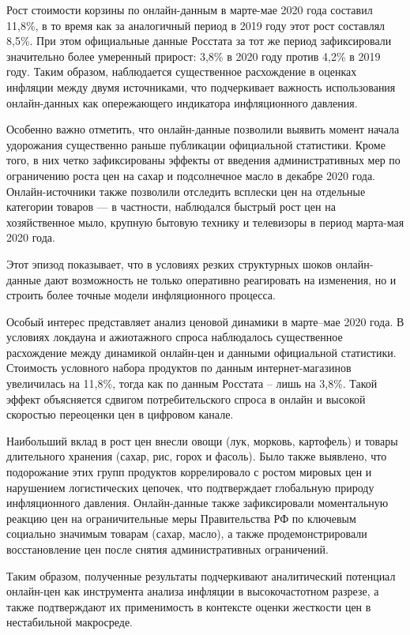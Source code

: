 Рост стоимости корзины по онлайн-данным в марте-мае 2020 года составил 11{,}8\%, в то время как за аналогичный период в 2019 году этот рост составлял 8{,}5\%. При этом официальные данные Росстата за тот же период зафиксировали значительно более умеренный прирост: 3{,}8\% в 2020 году против 4{,}2\% в 2019 году. Таким образом, наблюдается существенное расхождение в оценках инфляции между двумя источниками, что подчеркивает важность использования онлайн-данных как опережающего индикатора инфляционного давления.

Особенно важно отметить, что онлайн-данные позволили выявить момент начала удорожания существенно раньше публикации официальной статистики. Кроме того, в них четко зафиксированы эффекты от введения административных мер по ограничению роста цен на сахар и подсолнечное масло в декабре 2020 года. Онлайн-источники также позволили отследить всплески цен на отдельные категории товаров — в частности, наблюдался быстрый рост цен на хозяйственное мыло, крупную бытовую технику и телевизоры в период марта-мая 2020 года. 

Этот эпизод показывает, что в условиях резких структурных шоков онлайн-данные дают возможность не только оперативно реагировать на изменения, но и строить более точные модели инфляционного процесса.

Особый интерес представляет анализ ценовой динамики в марте–мае 2020 года. В условиях локдауна и ажиотажного спроса наблюдалось существенное расхождение между динамикой онлайн-цен и данными официальной статистики. Стоимость условного набора продуктов по данным интернет-магазинов увеличилась на 11{,}8\%, тогда как по данным Росстата – лишь на 3{,}8\%. Такой эффект объясняется сдвигом потребительского спроса в онлайн и высокой скоростью переоценки цен в цифровом канале.

Наибольший вклад в рост цен внесли овощи (лук, морковь, картофель) и товары длительного хранения (сахар, рис, горох и фасоль). Было также выявлено, что подорожание этих групп продуктов коррелировало с ростом мировых цен и нарушением логистических цепочек, что подтверждает глобальную природу инфляционного давления. Онлайн-данные также зафиксировали моментальную реакцию цен на ограничительные меры Правительства РФ по ключевым социально значимым товарам (сахар, масло), а также продемонстрировали восстановление цен после снятия административных ограничений.

Таким образом, полученные результаты подчеркивают аналитический потенциал онлайн-цен как инструмента анализа инфляции в высокочастотном разрезе, а также подтверждают их применимость в контексте оценки жесткости цен в нестабильной макросреде.

